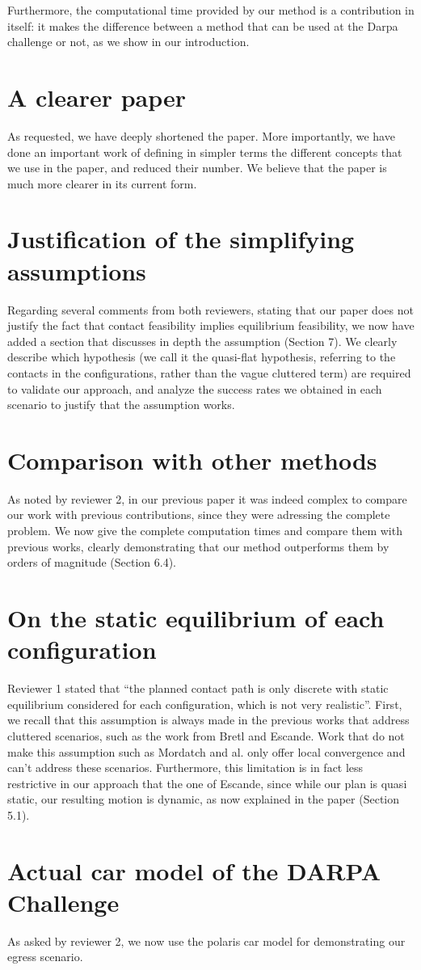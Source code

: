 \documentclass[12pt]{article}
\begin{document}
Furthermore, the computational time provided by our method is a contribution in itself: it makes the difference
between a method that can be used at the Darpa challenge or not, as we show in our introduction.

\section{A clearer paper}
As requested, we have deeply shortened the paper. More importantly, we have done an important work of defining in simpler terms
the different concepts that we use in the paper, and reduced their number.
We believe that the paper is much more clearer in its current form.

\section{Justification of the simplifying assumptions}
Regarding several comments from both reviewers, stating that our paper does not justify the fact that contact feasibility implies equilibrium feasibility,
we now have added a section that discusses in depth the assumption (Section 7). We clearly describe which hypothesis (we call it the quasi-flat hypothesis, referring
to the contacts in the configurations, rather than the vague cluttered term) are required to validate our approach, and analyze
the success rates we obtained in each scenario to justify that the assumption works.

\section{Comparison with other methods}
As noted by reviewer 2, in our previous paper it was indeed complex to compare our work with previous contributions,
since they were adressing the complete problem. We now give the complete computation times and compare them with previous works,
clearly demonstrating that our method outperforms them by orders of magnitude (Section 6.4).


\section{On the static equilibrium of each configuration}
Reviewer 1 stated that ``the planned contact path is only discrete with static equilibrium considered for each
configuration, which is not very realistic''. First, we recall that this assumption is always made in the previous works that address cluttered scenarios,
such as the work from Bretl and Escande. Work that do not make this assumption such as Mordatch and al. only offer local convergence and can't address these scenarios. Furthermore, this limitation is in fact less restrictive in our approach that the one of Escande, since while our plan is quasi static, our resulting motion is dynamic, as now explained in the paper (Section 5.1). 

\section{Actual car model of the DARPA Challenge}
As asked by reviewer 2, we now use the polaris car model for demonstrating our egress scenario.
\end{document}
